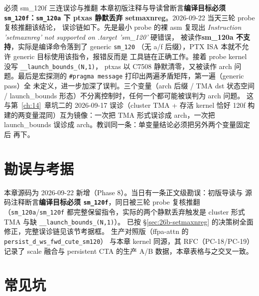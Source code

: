 \begin{kaogu}[本章初版当日修正]{必须 sm\_120f 三连误诊与推翻}
本章初版注释与导读曾断言\textbf{编译目标必须 \texttt{sm\_120f}：\texttt{sm\_120a} 下
ptxas 静默丢弃 setmaxnreg}。2026-09-22 当天三轮 probe 复核推翻该结论，
误诊链如下。先是最小 probe 的裸 asm 复现出
\emph{Instruction 'setmaxnreg' not supported on .target 'sm\_120'} 硬错误，
被读作\textbf{sm\_120a 不支持}，实际是编译命令落到了 generic \texttt{sm\_120}
（无 a/f 后缀），PTX ISA 本就不允许 generic 目标使用该指令，报错反而是
工具链在正确工作。接着 probe kernel 没写 \texttt{\_\_launch\_\allowbreak{}bounds\_\allowbreak{}(N,1)}，
ptxas 以 C7508 静默清零，又被读作 arch 问题。最后是宏探测的
\texttt{\#pragma message} 打印出两遍矛盾矩阵，第一遍（generic pass）全
未定义，进一步加深了误判。三个变量（arch 后缀 / TMA dst 状态空间 /
launch\_bounds 形态）不分离控制时，任何一个都可能被误判为 arch 问题。
这与第~\ref{ch:14}~章坑二的 2026-09-17 误诊（cluster TMA + 存活 kernel 恰好
120f 构建的两变量混同）互为镜像：一次把 TMA 形式误诊成 arch，一次把
launch\_bounds 误诊成 arch。教训同一条：单变量结论必须把另外两个变量固定后
再下。
\end{kaogu}

\section{勘误与考据}\label{sec:26b-kaogu}

本章源码为 2026-09-22 新增（Phase 8）。当日有一条正文级勘误：初版导读与
源码注释断言\textbf{编译目标必须 \texttt{sm\_120f}}，同日被三轮 probe 复核推翻
（\texttt{sm\_120a}/\texttt{sm\_120f} 都完整保留指令，实际的两个静默丢弃触发是
cluster 形式 TMA 与缺 \texttt{\_\_launch\_\allowbreak{}bounds\_\allowbreak{}(N,1)}）。
已按 \S\ref{sec:26b-setmaxnreg} 的决策树全面修正，完整误诊链见该节考据框。
生产对照版（ffpa-attn 的 \texttt{persist\_\allowbreak{}d\_\allowbreak{}ws\_\allowbreak{}fwd\_\allowbreak{}cute\_\allowbreak{}sm120}）
与本章 kernel 同源，其 RFC（PC-18/PC-19）记录了 scale 融合与 persistent CTA
的生产 A/B 数据，本章表格与之交叉一致。

\section{常见坑}\label{sec:26b-pitfalls}

